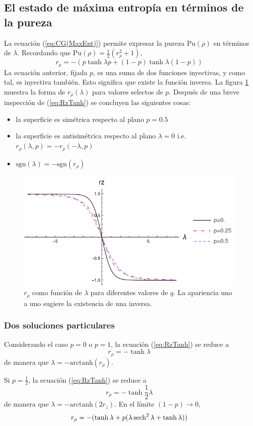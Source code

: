 \subsection{El estado de máxima entropía en términos de la pureza}

La ecuación (\ref{eq:CG(MaxEnt)}) permite expresar la pureza $\text{Pu}(\rho)$ en términos de $\lambda$. Recordando que $\text{Pu}(\rho)=\frac{1}{2}(r_{\rho}^{2}+1)$,
\begin{equation}\label{eq:RzTanh}
    \boxed{r_{\rho}=-(p\tanh{\lambda p}+(1-p)\tanh{\lambda (1-p)})}  
\end{equation}
La ecuación anterior, fijada $p$, es una suma de dos funciones inyectivas, y como tal, es inyectiva también. Esto significa que existe la función inversa. La figura \ref{fig:rzinv} muestra la forma de $r_{\rho}(\lambda)$ para valores selectos de $p$. Después de una breve inspección de (\ref{eq:RzTanh}) se concluyen las siguientes cosas:
\begin{itemize}
\item la superficie es simétrica respecto al plano $p=0.5$
\item la superficie es antisimétrica  respecto al plano $\lambda=0$ i.e. $r_{\rho}(\lambda,p)=-r_{\rho}(-\lambda,p)$
\item $\text{sgn}(\lambda)=-\text{sgn}(r_{\rho})$
\end{itemize}
\begin{figure}[h!]
\centering
\includegraphics[width=0.6\linewidth]{maxent/figures/rz(lambda)_lambda-8to8.png}
\caption{$r_{\rho}$ como función de $\lambda$ para diferentes valores de $q$. La apariencia uno a uno sugiere la existencia de una inversa.}
\label{fig:rzinv}
\end{figure}

\subsubsection{Dos soluciones particulares}

Considerando el caso $p=0$ o $p=1$, la ecuación (\ref{eq:RzTanh}) se reduce a 
\begin{equation}
r_{\rho}=-\tanh{\lambda}
\end{equation}
de manera que $\lambda=-\text{arctanh}(r_{\rho})$.

Si $p=\frac{1}{2}$, la ecuación (\ref{eq:RzTanh}) se reduce a
\begin{equation}
r_{\rho}=-\tanh\frac{1}{2}\lambda
\end{equation}
de manera que $\lambda=-\text{arctanh}(2r_{z})$.
En el límite $(1-p)\rightarrow 0$,
\begin{equation}
  r_{\rho}=-(\tanh{\lambda}+p(\lambda\sech^{2}{\lambda}+\tanh{\lambda}))
\end{equation}
\newpage